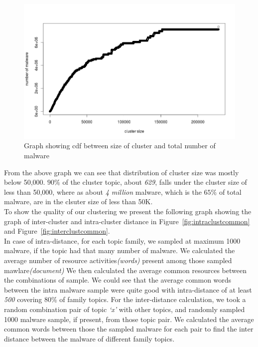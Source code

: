\begin{figure}[htbp]
\begin{center}
  \includegraphics[scale=0.3]{figures/cdfclusterlen2.png}
\end{center}
\caption{Graph showing cdf between size of cluster and total number of malware}
\label{fig:cdfclusterlen}
\end{figure}
From the above graph we can see that distribution of cluster size was mostly below 50,000.
$90\%$ of the cluster topic, about \emph{629}, falls under the cluster size of less than 50,000, where as about \emph{4 million} malware, which is the $65\%$ of total malware, are in the clsuter size of less than 50K.\\
To show the quality of our clustering we present the following graph showing the graph of inter-cluster and intra-cluster distance in Figure~\ref{fig:intraclustcommon} and Figure~\ref{fig:interclustcommon}.\\
In case of intra-distance, for each topic family, we sampled at maximum 1000 malware, if the topic had that many number of malware. We calculated the average number of resource activities\textit{(words)} present among those sampled mawlare\textit{(document)}
We then calculated the average common resources between the combinations of sample. We could see that the average common words between the intra malware sample were quite good with intra-distance of at least \emph{500} covering $80\%$ of family topics.
For the inter-distance calculation, we took a random combination pair of topic \emph{`x'} with other topics, and randomly sampled 1000 malware sample, if present, from those topic pair.
We calculated the average common words between those the sampled malware for each pair to find the inter distance between the malware of different family topics.
